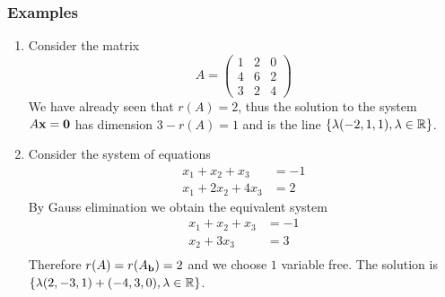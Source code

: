\documentclass[11pt,aspectratio=169]{beamer}
\begin{document}
\begin{frame}
\frametitle{Examples}
\begin{small}
\begin{enumerate}

\item Consider the matrix \begin{equation*}
A=\begin{pmatrix}
1 & 2 & 0\\
4 & 6 & 2 \\
3 & 2 & 4
\end{pmatrix}
\end{equation*}
We have already seen that $r(A)=2$, thus the solution to the system $A{\bf x}={\bf 0}$ has dimension $3-r(A)=1$ and is the line $\{\lambda (-2,1,1), \lambda \in \mathbb R\}$.

\item Consider the system of equations
\begin{equation*}
\begin{split}
x_1+x_2+x_3&=-1 \\
x_1+2x_2+4x_3&=2 
\end{split}
\end{equation*}
By Gauss elimination we obtain the equivalent system \begin{equation*}
\begin{split}
x_1+x_2+x_3&=-1 \\
x_2+3x_3&=3\\
\end{split}
\end{equation*}
Therefore $r(A)=r(A_{{\bf b}})=2$ and we choose $1$  variable  free.
The solution is $\{\lambda (2, -3, 1)+(-4,3, 0), \lambda \in \mathbb R\}$.
\end{enumerate}

\end{small}
\end{frame}
\end{document}
